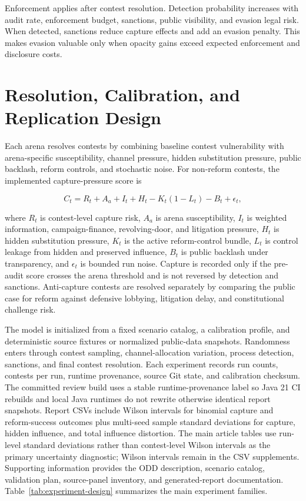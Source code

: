 Enforcement applies after contest resolution. Detection probability increases with audit rate, enforcement budget, sanctions, public visibility, and evasion legal risk. When detected, sanctions reduce capture effects and add an evasion penalty. This makes evasion valuable only when opacity gains exceed expected enforcement and disclosure costs.

\section{Resolution, Calibration, and Replication Design}

Each arena resolves contests by combining baseline contest vulnerability with arena-specific susceptibility, channel pressure, hidden substitution pressure, public backlash, reform controls, and stochastic noise. For non-reform contests, the implemented capture-pressure score is

\[
C_t = R_t + A_a + I_t + H_t - K_t(1 - L_t) - B_t + \epsilon_t,
\]

where \(R_t\) is contest-level capture risk, \(A_a\) is arena susceptibility, \(I_t\) is weighted information, campaign-finance, revolving-door, and litigation pressure, \(H_t\) is hidden substitution pressure, \(K_t\) is the active reform-control bundle, \(L_t\) is control leakage from hidden and preserved influence, \(B_t\) is public backlash under transparency, and \(\epsilon_t\) is bounded run noise. Capture is recorded only if the pre-audit score crosses the arena threshold and is not reversed by detection and sanctions. Anti-capture contests are resolved separately by comparing the public case for reform against defensive lobbying, litigation delay, and constitutional challenge risk.

The model is initialized from a fixed scenario catalog, a calibration profile, and deterministic source fixtures or normalized public-data snapshots. Randomness enters through contest sampling, channel-allocation variation, process detection, sanctions, and final contest resolution. Each experiment records run counts, contests per run, runtime provenance, source Git state, and calibration checksum. The committed review build uses a stable runtime-provenance label so Java 21 CI rebuilds and local Java runtimes do not rewrite otherwise identical report snapshots. Report CSVs include Wilson intervals for binomial capture and reform-success outcomes plus multi-seed sample standard deviations for capture, hidden influence, and total influence distortion. The main article tables use run-level standard deviations rather than contest-level Wilson intervals as the primary uncertainty diagnostic; Wilson intervals remain in the CSV supplements. Supporting information provides the ODD description, scenario catalog, validation plan, source-panel inventory, and generated-report documentation. Table~\ref{tab:experiment-design} summarizes the main experiment families.

